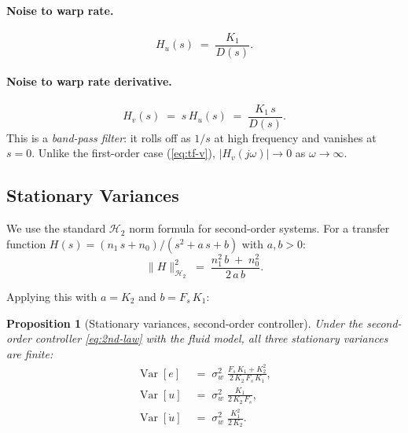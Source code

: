 \documentclass[11pt, a4paper]{article}
\theoremstyle{definition}
\theoremstyle{plain}
\newtheorem{proposition}[theorem]{Proposition}
\theoremstyle{remark}
\newcommand{\Var}{\operatorname{Var}}
\begin{document}
\paragraph{Noise to warp rate.}
\begin{equation}\label{eq:2nd-tf-u}
  H_u(s) \;=\; \frac{K_1}{D(s)}.
\end{equation}

\paragraph{Noise to warp rate derivative.}
\begin{equation}\label{eq:2nd-tf-v}
  H_v(s) \;=\; s\,H_u(s) \;=\; \frac{K_1\,s}{D(s)}.
\end{equation}
This is a \emph{band-pass filter}: it rolls off as $1/s$ at high
frequency and vanishes at $s = 0$.  Unlike the first-order case
(\cref{eq:tf-v}), $|H_v(j\omega)| \to 0$ as $\omega \to \infty$.

\subsection{Stationary Variances}\label{sec:2nd-variances}

We use the standard $\mathcal{H}_2$ norm formula for second-order
systems.  For a transfer function $H(s) = (n_1\,s + n_0)/
(s^2 + a\,s + b)$ with $a, b > 0$:
\begin{equation}\label{eq:h2-formula}
  \|H\|_{\mathcal{H}_2}^2
    \;=\; \frac{n_1^2\,b \;+\; n_0^2}{2\,a\,b}.
\end{equation}

Applying this with $a = K_2$ and $b = F_s\,K_1$:

\begin{proposition}[Stationary variances, second-order controller]
  \label{prop:2nd-variances}
  Under the second-order controller \eqref{eq:2nd-law} with the
  fluid model, all three stationary variances are finite:
  \begin{align}
    \Var[e]
      &\;=\; \sigma_w^2\;\frac{F_s\,K_1 + K_2^2}{2\,K_2\,F_s\,K_1},
      \label{eq:2nd-var-e} \\[6pt]
    \Var[u]
      &\;=\; \sigma_w^2\;\frac{K_1}{2\,K_2\,F_s},
      \label{eq:2nd-var-u} \\[6pt]
    \Var[\dot{u}]
      &\;=\; \sigma_w^2\;\frac{K_1^2}{2\,K_2}.
      \label{eq:2nd-var-v}
  \end{align}
\end{proposition}
\end{document}

